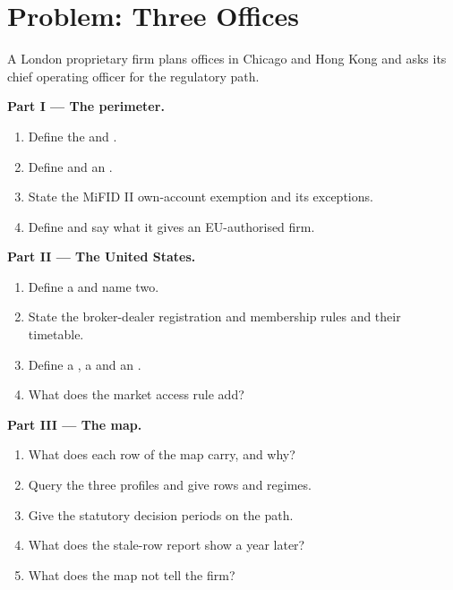 \section{Problem: Three Offices}

\begin{problem}\label{pb:fm:regulators-and-licences:1}
A London proprietary firm plans offices in Chicago and Hong Kong and asks its chief operating officer for the regulatory path.

\medskip\noindent\textbf{Part I --- The perimeter.}
\begin{enumerate}
\item Define the  and .
\item Define  and an .
\item State the MiFID II own-account exemption and its exceptions.
\item Define  and say what it gives an EU-authorised firm.
\end{enumerate}

\medskip\noindent\textbf{Part II --- The United States.}
\begin{enumerate}[resume]
\item Define a  and name two.
\item State the broker-dealer registration and membership rules and their timetable.
\item Define a , a  and an .
\item What does the market access rule add?
\end{enumerate}

\medskip\noindent\textbf{Part III --- The map.}
\begin{enumerate}[resume]
\item What does each row of the map carry, and why?
\item Query the three profiles and give rows and regimes.
\item Give the statutory decision periods on the path.
\item What does the stale-row report show a year later?
\item What does the map not tell the firm?
\end{enumerate}


\end{problem}
